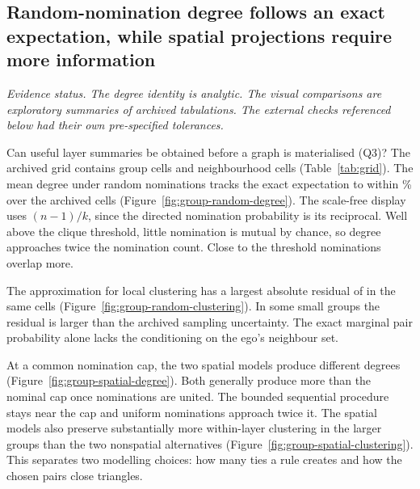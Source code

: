 \subsection{Random-nomination degree follows an exact expectation, while spatial projections require more information}
\label{res:theory}
\textit{Evidence status. The degree identity is analytic. The visual comparisons are exploratory summaries of archived tabulations. The external checks referenced below had their own pre-specified tolerances.}

Can useful layer summaries be obtained before a graph is materialised (Q3)? The archived grid contains \GroupRows{} group cells and \NeighbourRows{} neighbourhood cells (Table~\ref{tab:grid}). The mean degree under random nominations tracks the exact expectation to within \RandomDegreeError\% over the archived cells (Figure~\ref{fig:group-random-degree}). The scale-free display uses $(n-1)/k$, since the directed nomination probability is its reciprocal. Well above the clique threshold, little nomination is mutual by chance, so degree approaches twice the nomination count. Close to the threshold nominations overlap more.


The approximation for local clustering has a largest absolute residual of \RandomClosureError{} in the same cells (Figure~\ref{fig:group-random-clustering}). In some small groups the residual is larger than the archived sampling uncertainty. The exact marginal pair probability alone lacks the conditioning on the ego's neighbour set.

At a common nomination cap, the two spatial models produce different degrees (Figure~\ref{fig:group-spatial-degree}). Both generally produce more than the nominal cap once nominations are united. The bounded sequential procedure stays near the cap and uniform nominations approach twice it. The spatial models also preserve substantially more within-layer clustering in the larger groups than the two nonspatial alternatives (Figure~\ref{fig:group-spatial-clustering}). This separates two modelling choices: how many ties a rule creates and how the chosen pairs close triangles.

